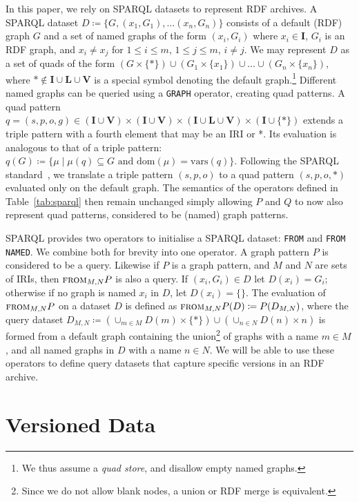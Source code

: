 \documentclass{llncs}
\newcommand{\I}{\ensuremath{\mathbf{I}}\xspace}
\renewcommand{\L}{\ensuremath{\mathbf{L}}\xspace}
\newcommand{\V}{\ensuremath{\mathbf{V}}\xspace}
\newcommand{\sfrom}[3]{\ensuremath{\textsc{from}_{#2,#3}#1}}
\newcommand{\dom}[1]{\ensuremath{\mathrm{dom}(#1)}}
\newcommand{\vars}[1]{\ensuremath{\mathrm{vars}(#1)}}
\begin{document}
In this paper, we rely on SPARQL datasets to represent RDF archives. A SPARQL dataset $D \coloneqq \{ G, (x_1,G_1), \ldots (x_n,G_n) \}$ consists of a default (RDF) graph $G$ and a set of named graphs of the form $(x_i,G_i)$ where $x_i \in \I$, $G_i$ is an RDF graph, and $x_i \neq x_j$ for $1 \leq i \leq m$, $1 \leq j \leq m$, $i \neq j$. We may represent $D$ as a set of quads of the form $(G \times \{*\}) \cup (G_1 \times \{x_1\}) \cup \ldots \cup (G_n \times \{x_n\})$, where $* \notin \I \cup \L \cup \V$ is a special symbol denoting the default graph.\footnote{We thus assume a \textit{quad store}, and disallow empty named graphs.} Different named graphs can be queried using a \texttt{GRAPH} operator, creating quad patterns. A quad pattern $q = (s,p,o,g) \in (\I \cup \V) \times (\I \cup \V) \times (\I \cup \L \cup \V) \times (\I \cup \{ *\})$ extends a triple pattern with a fourth element that may be an IRI or *. Its evaluation is analogous to that of a triple pattern: $q(G) \coloneqq \{ \mu \mid \mu(q) \subseteq G\text{ and }\dom{\mu} = \vars{q} \}$.
Following the SPARQL standard~\cite{sparql11}, we translate a triple pattern $(s,p,o)$ to a quad pattern $(s,p,o,*)$ evaluated only on the default graph. The semantics of the operators defined in Table~\ref{tab:sparql} then remain unchanged simply allowing $P$ and $Q$ to now also represent quad patterns, considered to be (named) graph patterns.

SPARQL provides two operators to initialise a SPARQL dataset: \texttt{FROM} and \texttt{FROM NAMED}. We combine both for brevity into one operator. A graph pattern $P$ is considered to be a query. Likewise if $P$ is a graph pattern, and $M$ and $N$ are sets of IRIs, then $\sfrom{P}{M}{N}$ is also a query. If $(x_i,G_i) \in D$ let $D(x_i) = G_i$; otherwise if no graph is named $x_i$ in $D$, let $D(x_i) = \{\}$. The evaluation of $\sfrom{P}{M}{N}$ on a dataset $D$ is defined as $\sfrom{P}{M}{N}(D) \coloneqq P(D_{M,N})$, where the query dataset $D_{M,N} \coloneqq (\cup_{m \in M} D(m) \times \{ *\}) \cup  (\cup_{n \in N} D(n) \times n)$ is formed from a default graph containing the union\footnote{Since we do not allow blank nodes, a union or RDF merge is equivalent.} of graphs with a name $m \in M$, and all named graphs in $D$ with a name $n \in N$. We will be able to use these operators to define query datasets that capture specific versions in an RDF archive.

\section{Versioned Data}
\end{document}
